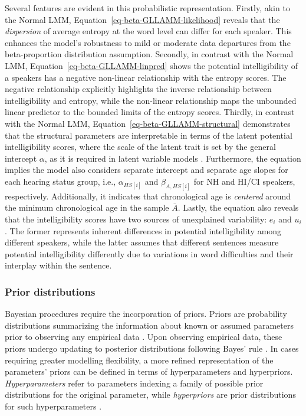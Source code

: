 \documentclass[
  authoryear,
  preprint,
  1p]{elsarticle}
\begin{document}
Several features are evident in this probabilistic representation.
Firstly, akin to the Normal LMM,
Equation~\ref{eq-beta-GLLAMM-likelihood} reveals that the
\emph{dispersion} of average entropy at the word level can differ for
each speaker. This enhances the model's robustness to mild or moderate
data departures from the beta-proportion distribution assumption.
{Secondly, in contrast with the Normal LMM,
Equation~\ref{eq-beta-GLLAMM-linpred} shows the potential
intelligibility of a speakers has a negative non-linear relationship
with the entropy scores. The negative relationship explicitly highlights
the inverse relationship between intelligibility and entropy, while the
non-linear relationship maps the unbounded linear predictor to the
bounded limits of the entropy scores. Thirdly, in contrast with the
Normal LMM, Equation~\ref{eq-beta-GLLAMM-structural} demonstrates that
the structural parameters are interpretable in terms of the latent
potential intelligibility scores, where the scale of the latent trait is
set by the general intercept \(\alpha\), as it is required in latent
variable models \citep{Depaoli_2021}. Furthermore, the equation implies
the model also considers separate intercept and separate age slopes for
each hearing status group, i.e., \(\alpha_{HS[i]}\) and
\(\beta_{A, HS[i]}\) for NH and HI/CI speakers, respectively.
Additionally, it indicates that chronological age is \emph{centered}
around the minimum chronological age in the sample \(\bar{A}\). Lastly,
the equation also reveals that the intelligibility scores have two
sources of unexplained variability: \(e_{i}\) and \(u_{i}\).} The former
represents inherent differences in potential intelligibility among
different speakers, while the latter assumes that different sentences
measure potential intelligibility differently due to variations in word
difficulties and their interplay within the sentence.

\subsubsection{Prior distributions}\label{sec-M-SM-P}

Bayesian procedures require the incorporation of priors. Priors are
probability distributions summarizing the information about known or
assumed parameters prior to observing any empirical data
\citep{Everitt_et_al_2010}. Upon observing empirical data, these priors
undergo updating to posterior distributions following Bayes' rule
\citep{Jeffreys_1998}. In cases requiring greater modelling flexibility,
a more refined representation of the parameters' priors can be defined
in terms of hyperparameters and hyperpriors. \emph{Hyperparameters}
refer to parameters indexing a family of possible prior distributions
for the original parameter, while \emph{hyperpriors} are prior
distributions for such hyperparameters \citep{Everitt_et_al_2010}.
\end{document}
